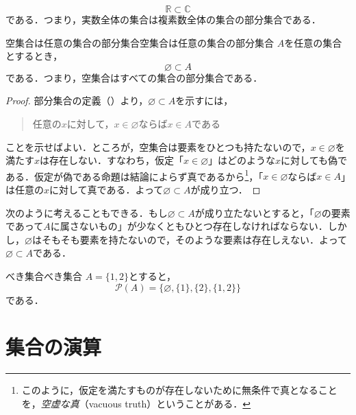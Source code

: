\begin{example}{}{}
  \[
    \mathbb{R} \subset \mathbb{C}
  \]
  である．つまり，実数全体の集合は複素数全体の集合の部分集合である．
\end{example}

\begin{prop}{空集合は任意の集合の部分集合}{空集合は任意の集合の部分集合}
  $A$を任意の集合とするとき，
  \[
    \varnothing \subset A
  \]
  である．つまり，空集合はすべての集合の部分集合である．
\end{prop}

\begin{tleftbar}
  \begin{proof}
    部分集合の定義（）より，$\varnothing \subset A$を示すには，
    \begin{quotation}
      任意の$x$に対して，$x \in \varnothing$ならば$x \in A$である
    \end{quotation}
    ことを示せばよい．ところが，空集合は要素をひとつも持たないので，$x \in \varnothing$を満たす$x$は存在しない．すなわち，仮定「$x \in \varnothing$」はどのような$x$に対しても偽である．仮定が偽である命題は結論によらず真であるから\footnote{このように，仮定を満たすものが存在しないために無条件で真となることを，\emph{空虚な真}（vacuous truth）ということがある．}，「$x \in \varnothing$ならば$x \in A$」は任意の$x$に対して真である．よって$\varnothing \subset A$が成り立つ．
  \end{proof}
\end{tleftbar}

\begin{remark}[背理法による見方]
  次のように考えることもできる．もし$\varnothing \subset A$が成り立たないとすると，「$\varnothing$の要素であって$A$に属さないもの」が少なくともひとつ存在しなければならない．しかし，$\varnothing$はそもそも要素を持たないので，そのような要素は存在しえない．よって$\varnothing \subset A$である．
\end{remark}

\begin{example}{べき集合}{べき集合}
  $A=\{ 1, 2\}$とすると，
  \[
    \mathcal{P}(A) = \{ \varnothing, \{1\}, \{2\}, \{1, 2\}\}
  \]
  である．
\end{example}



\section{集合の演算}

